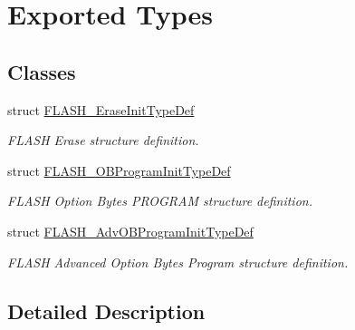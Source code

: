 \hypertarget{group___f_l_a_s_h_ex___exported___types}{\section{Exported Types}
\label{group___f_l_a_s_h_ex___exported___types}
}
\subsection*{Classes}
\begin{DoxyCompactItemize}
\item 
struct \hyperlink{struct_f_l_a_s_h___erase_init_type_def}{F\-L\-A\-S\-H\-\_\-\-Erase\-Init\-Type\-Def}
\begin{DoxyCompactList}\small\item\em F\-L\-A\-S\-H Erase structure definition. \end{DoxyCompactList}\item 
struct \hyperlink{struct_f_l_a_s_h___o_b_program_init_type_def}{F\-L\-A\-S\-H\-\_\-\-O\-B\-Program\-Init\-Type\-Def}
\begin{DoxyCompactList}\small\item\em F\-L\-A\-S\-H Option Bytes P\-R\-O\-G\-R\-A\-M structure definition. \end{DoxyCompactList}\item 
struct \hyperlink{struct_f_l_a_s_h___adv_o_b_program_init_type_def}{F\-L\-A\-S\-H\-\_\-\-Adv\-O\-B\-Program\-Init\-Type\-Def}
\begin{DoxyCompactList}\small\item\em F\-L\-A\-S\-H Advanced Option Bytes Program structure definition. \end{DoxyCompactList}\end{DoxyCompactItemize}


\subsection{Detailed Description}
